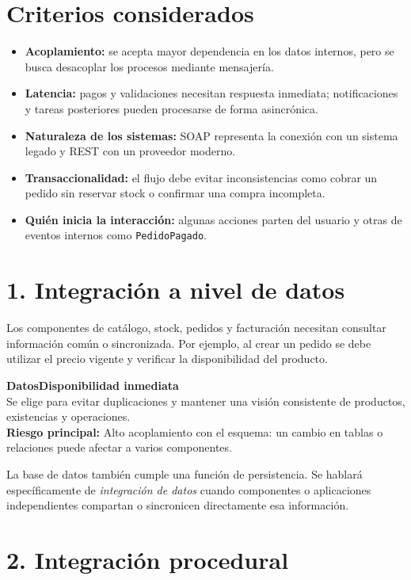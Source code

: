 \documentclass[10pt,a4paper]{article}
\newcommand{\typebox}[4]{%
  \vspace{1pt}
  \noindent\colorbox{soft}{%
    \parbox{0.965\linewidth}{%
      \textbf{\color{primary}\large #1}\hfill\textbf{\color{accent}#2}\\[2pt]
      #3\\[2pt]
      \textbf{\color{risk}Riesgo principal:} #4
    }%
  }
  \vspace{1pt}
}
\begin{document}
\section*{Criterios considerados}

\begin{itemize}
  \item \textbf{Acoplamiento:} se acepta mayor dependencia en los datos internos, pero se busca desacoplar los procesos mediante mensajería.
  \item \textbf{Latencia:} pagos y validaciones necesitan respuesta inmediata; notificaciones y tareas posteriores pueden procesarse de forma asincrónica.
  \item \textbf{Naturaleza de los sistemas:} SOAP representa la conexión con un sistema legado y REST con un proveedor moderno.
  \item \textbf{Transaccionalidad:} el flujo debe evitar inconsistencias como cobrar un pedido sin reservar stock o confirmar una compra incompleta.
  \item \textbf{Quién inicia la interacción:} algunas acciones parten del usuario y otras de eventos internos como \texttt{PedidoPagado}.
\end{itemize}

\newpage

\section*{1. Integración a nivel de datos}

Los componentes de catálogo, stock, pedidos y facturación necesitan consultar información común o sincronizada. Por ejemplo, al crear un pedido se debe utilizar el precio vigente y verificar la disponibilidad del producto.

\typebox{Datos}{Disponibilidad inmediata}{Se elige para evitar duplicaciones y mantener una visión consistente de productos, existencias y operaciones.}{Alto acoplamiento con el esquema: un cambio en tablas o relaciones puede afectar a varios componentes.}

La base de datos también cumple una función de persistencia. Se hablará específicamente de \emph{integración de datos} cuando componentes o aplicaciones independientes compartan o sincronicen directamente esa información.

\section*{2. Integración procedural}
\end{document}
